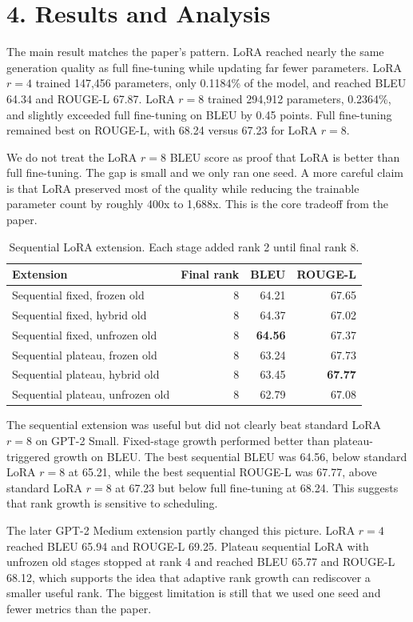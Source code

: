 \documentclass[11pt]{article}
\begin{document}
\section{4. Results and Analysis}
The main result matches the paper's pattern. LoRA reached nearly the same generation quality as full fine-tuning while updating far fewer parameters. LoRA $r=4$ trained 147,456 parameters, only 0.1184\% of the model, and reached BLEU 64.34 and ROUGE-L 67.87. LoRA $r=8$ trained 294,912 parameters, 0.2364\%, and slightly exceeded full fine-tuning on BLEU by 0.45 points. Full fine-tuning remained best on ROUGE-L, with 68.24 versus 67.23 for LoRA $r=8$.

We do not treat the LoRA $r=8$ BLEU score as proof that LoRA is better than full fine-tuning. The gap is small and we only ran one seed. A more careful claim is that LoRA preserved most of the quality while reducing the trainable parameter count by roughly 400x to 1,688x. This is the core tradeoff from the paper.

\begin{table}[h]
\centering
\scriptsize
\begin{tabular}{lrrr}
\toprule
Extension & Final rank & BLEU & ROUGE-L \\
\midrule
Sequential fixed, frozen old & 8 & 64.21 & 67.65 \\
Sequential fixed, hybrid old & 8 & 64.37 & 67.02 \\
Sequential fixed, unfrozen old & 8 & \textbf{64.56} & 67.37 \\
Sequential plateau, frozen old & 8 & 63.24 & 67.73 \\
Sequential plateau, hybrid old & 8 & 63.45 & \textbf{67.77} \\
Sequential plateau, unfrozen old & 8 & 62.79 & 67.08 \\
\bottomrule
\end{tabular}
\caption{Sequential LoRA extension. Each stage added rank 2 until final rank 8.}
\end{table}

The sequential extension was useful but did not clearly beat standard LoRA $r=8$ on GPT-2 Small. Fixed-stage growth performed better than plateau-triggered growth on BLEU. The best sequential BLEU was 64.56, below standard LoRA $r=8$ at 65.21, while the best sequential ROUGE-L was 67.77, above standard LoRA $r=8$ at 67.23 but below full fine-tuning at 68.24. This suggests that rank growth is sensitive to scheduling.

The later GPT-2 Medium extension partly changed this picture. LoRA $r=4$ reached BLEU 65.94 and ROUGE-L 69.25. Plateau sequential LoRA with unfrozen old stages stopped at rank 4 and reached BLEU 65.77 and ROUGE-L 68.12, which supports the idea that adaptive rank growth can rediscover a smaller useful rank. The biggest limitation is still that we used one seed and fewer metrics than the paper.
\end{document}
